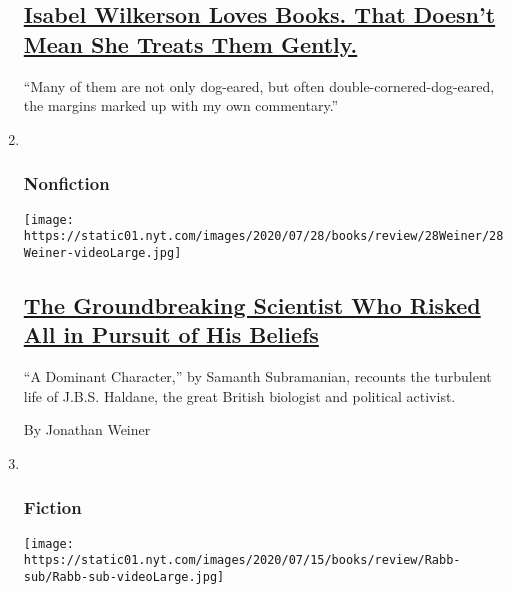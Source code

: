 \begin{enumerate}
  \hypertarget{isabel-wilkerson-loves-books-that-doesnt-mean-she-treats-them-gently}{%
  \subsection{\texorpdfstring{\href{/2020/07/30/books/review/isabel-wilkerson-by-the-book-interview.html}{Isabel
  Wilkerson Loves Books. That Doesn't Mean She Treats Them
  Gently.}}{Isabel Wilkerson Loves Books. That Doesn't Mean She Treats Them Gently.}}\label{isabel-wilkerson-loves-books-that-doesnt-mean-she-treats-them-gently}}

  ``Many of them are not only dog-eared, but often
  double-cornered-dog-eared, the margins marked up with my own
  commentary.''
\item ~
  \hypertarget{nonfiction-5}{%
  \subsubsection{Nonfiction}\label{nonfiction-5}}

  \texttt{[image: https://static01.nyt.com/images/2020/07/28/books/review/28Weiner/28Weiner-videoLarge.jpg]}

  \hypertarget{the-groundbreaking-scientist-who-risked-all-in-pursuit-of-his-beliefs}{%
  \subsection{\texorpdfstring{\href{/2020/07/28/books/review/a-dominant-character-haldane-samanth-subramanian.html}{The
  Groundbreaking Scientist Who Risked All in Pursuit of His
  Beliefs}}{The Groundbreaking Scientist Who Risked All in Pursuit of His Beliefs}}\label{the-groundbreaking-scientist-who-risked-all-in-pursuit-of-his-beliefs}}

  ``A Dominant Character,'' by Samanth Subramanian, recounts the
  turbulent life of J.B.S. Haldane, the great British biologist and
  political activist.

  By Jonathan Weiner
\item ~
  \hypertarget{fiction-1}{%
  \subsubsection{Fiction}\label{fiction-1}}

  \texttt{[image: https://static01.nyt.com/images/2020/07/15/books/review/Rabb-sub/Rabb-sub-videoLarge.jpg]}

  \hypertarget{this-movie-stars-only-hope-is-help-from-her-personal-assistant}{%
}
\end{enumerate}
